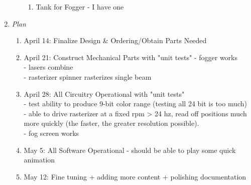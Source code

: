 \documentclass[12pt]{article}
\begin{document}
\begin{enumerate}
\begin{enumerate}
\begin{enumerate}
\item Tank for Fogger - I have one
\end{enumerate}
\end{enumerate}
\item
\emph{Plan}
\begin{enumerate}
\item
April 14: Finalize Design \& Ordering/Obtain Parts Needed
\item
April 21: Construct Mechanical Parts with "unit tests"
- fogger works\\
- lasers combine\\
- rasterizer spinner rasterizes single beam
\item
April 28: All Circuitry Operational with "unit tests"\\
- test ability to produce 9-bit color range (testing all 24 bit is too much)\\
- able to drive rasterizer at a fixed rpm > 24 hz, read off positions much more quickly
(the faster, the greater resolution possible).\\
- fog screen works
\item
May 5: All Software Operational
- should be able to play some quick animation
\item
May 12: Fine tuning + adding more content + polishing documentation
\end{enumerate}
\end{enumerate}
\end{document}
